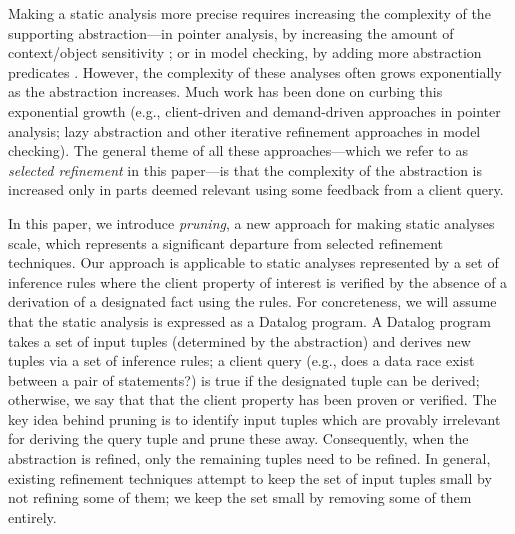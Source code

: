 
Making a static analysis more precise requires increasing the complexity of the
supporting abstraction---in pointer analysis, by increasing the amount of
context/object sensitivity \cite{kcfa, kobj, MilanovaRountevRyder2005,
WhaleyLam2004, LhotakHendren2006, LhotakHendren2008}; or in model checking, by
adding more abstraction predicates \cite{graf97predicate,slam}.
However, the complexity of these analyses often grows exponentially as the
abstraction increases.
Much work has been done on curbing this exponential growth
(e.g., client-driven \cite{GuyerLin2003} and demand-driven
\cite{HeintzeTardieu2001} approaches in pointer analysis;
lazy abstraction \cite{henzinger02lazy,mcmillan06lazy} and other iterative refinement approaches in model checking).
The general theme of all these approaches---which we refer to as {\em selected
refinement} in this paper---is that the complexity of the abstraction is
increased only in parts deemed relevant using some feedback from a client
query.

In this paper, we introduce {\em pruning}, a new approach for making static analyses scale,
which represents a significant departure from selected refinement techniques.
Our approach is applicable to static analyses represented
by a set of inference rules where the client property of interest
is verified by the absence of a derivation of a designated fact using the rules.
For concreteness, we will assume that the static analysis is expressed as a Datalog program.
A Datalog program takes a set of input tuples (determined by the abstraction)
and derives new tuples via a set of inference rules; a client
query (e.g., does a data race exist between a pair of statements?)
is true if the designated tuple can be derived; otherwise,
we say that that the client property has been proven or verified.
The key idea behind pruning
is to identify input tuples which are provably irrelevant for deriving the
query tuple and prune these away.  Consequently, when the abstraction is refined,
only the remaining tuples need to be refined.
In general, existing refinement techniques
attempt to keep the set of input tuples small by not refining some of them; we
keep the set small by removing some of them entirely.

